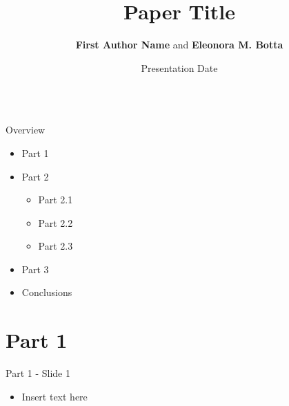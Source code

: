 \documentclass[aspectratio=169]{beamer}
\title[Conference Name]{\large \textbf{Paper Title}}
\author[Author 1 Last Name, Botta]{\textbf{First Author Name} and \textbf{Eleonora M. Botta}}
\institute{Conference Name \\ Conference Location}
\date{Presentation Date}
\begin{document}
\begin{frame}[plain]
\begin{columns}
    \begin{column}{0.8\linewidth}
        \titlepage
    \end{column}
    \begin{column}{0.2\linewidth}
        
    \end{column}
\end{columns}
\end{frame}


\begin{frame}{Overview}
    \begin{itemize}
        \item Part 1
        \vspace{2mm}
        \item Part 2
        \vspace{2mm}
        \begin{itemize}
            \item Part 2.1
            \item Part 2.2
            \item Part 2.3
        \end{itemize}
        \vspace{2mm}
        \item Part 3
        \vspace{2mm}
        \item Conclusions
    \end{itemize}
\end{frame}

\section{Part 1}
\begin{frame}{Part 1 - Slide 1}
    \begin{itemize}
        \item Insert text here
    \end{itemize}
\end{frame}
\end{document}
